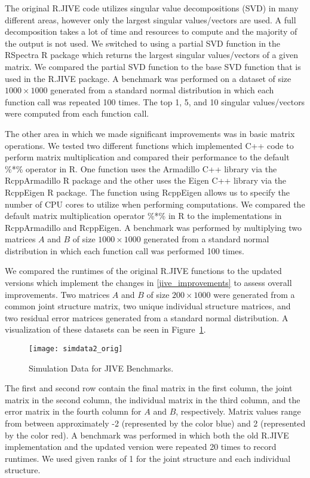 \documentclass[
12pt, %
letterpaper, %
oneside, %
headinclude,footinclude, %
BCOR5mm, %
]{scrartcl}
\begin{document}
The original R.JIVE code utilizes singular value decompositions (SVD) in many different areas, however only the largest singular values/vectors are used. A full decomposition takes a lot of time and resources to compute and the majority of the output is not used. We switched to using a partial SVD function in the RSpectra R package which returns the largest singular values/vectors of a given matrix.
We compared the partial SVD function to the base SVD function that is used in the R.JIVE package. A benchmark was performed on a dataset of size $1000 \times 1000$ generated from a standard normal distribution in which each function call was repeated 100 times. The top 1, 5, and 10 singular values/vectors were computed from each function call.

The other area in which we made significant improvements was in basic matrix operations. We tested two different functions which implemented C++ code to perform matrix multiplication and compared their performance to the default \%*\% operator in R. One function uses the Armadillo C++ library via the RcppArmadillo R package \citep{eddelbuettel2014rcpparmadillo} and the other uses the Eigen C++ library via the RcppEigen R package. The function using RcppEigen allows us to specify the number of CPU cores to utilize when performing computations.
We compared the default matrix multiplication operator \%*\% in R to the implementations in RcppArmadillo and RcppEigen. A benchmark was performed by multiplying two matrices $A$ and $B$ of size $1000 \times 1000$ generated from a standard normal distribution in which each function call was performed 100 times.

We compared the runtimes of the original R.JIVE functions to the updated versions which implement the changes in \ref{jive_improvements} to assess overall improvements. Two matrices $A$ and $B$ of size $200 \times 1000$ were generated from a common joint structure matrix, two unique individual structure matrices, and two residual error matrices generated from a standard normal distribution. A visualization of these datasets can be seen in Figure~\ref{fig:simdata2_orig}.

\begin{figure}[ht]
    \centering 
    \texttt{[image: simdata2\_orig]} 
    \caption[Simulation Data for JIVE Benchmarks]{Simulation Data for JIVE Benchmarks.}
    \label{fig:simdata2_orig} 
\end{figure}

The first and second row contain the final matrix in the first column, the joint matrix in the second column, the individual matrix in the third column, and the error matrix in the fourth column for $A$ and $B$, respectively. Matrix values range from between approximately -2 (represented by the color blue) and 2 (represented by the color red). A benchmark was performed in which both the old R.JIVE implementation and the updated version were repeated 20 times to record runtimes. We used given ranks of 1 for the joint structure and each individual structure.
\end{document}
